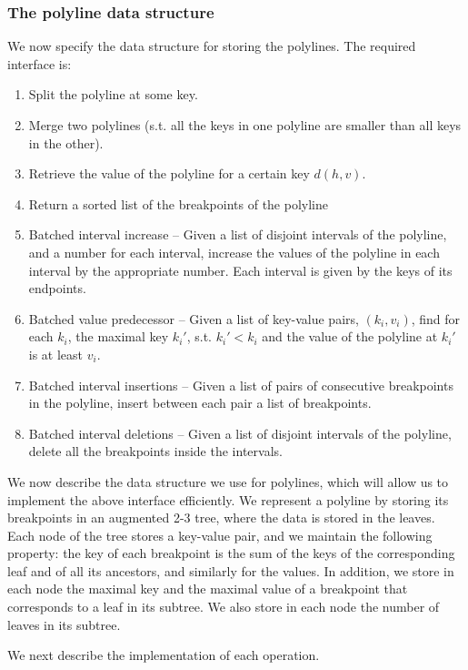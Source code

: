 \documentclass[a4paper,UKenglish]{lipics-v2016}
\theoremstyle{plain}
\begin{document}
\subsubsection{The polyline data structure} We now specify the data structure for storing the polylines. The required interface is:
\begin{enumerate}
\item \label{op1} Split the polyline at some key.
\item \label{op2} Merge two polylines (s.t. all the keys in one polyline are smaller than all keys in the other).
\item \label{op3} Retrieve the value of the polyline for a certain key $d(h,v)$.
\item \label{op4}Return a sorted list of the breakpoints of the polyline
\item \label{op5} Batched interval increase -- Given a list of disjoint intervals of the polyline, and a number for each interval, increase the values of the polyline in each interval by the appropriate number. Each interval is given by the keys of its endpoints.
\item \label{op6} Batched value predecessor -- Given a list of key-value pairs, $(k_i,v_i)$, find for each $k_i$, the maximal key $k_{i}'$, s.t. $k_{i}' < k_i$ and the value of the polyline at $k_{i}'$ is at least $v_i$.
\item \label{op7} Batched interval insertions -- Given a list of pairs of consecutive breakpoints in the polyline, insert between each pair a list of breakpoints.
\item \label{op8} Batched interval deletions -- Given a list of disjoint intervals of the polyline, delete all the breakpoints inside the intervals.
\end{enumerate}

We now describe the data structure we use for polylines, which will allow us to implement the above interface efficiently. We represent a polyline by storing its breakpoints in an augmented 2-3 tree, where the data is stored in the leaves. Each node of the tree stores a key-value pair, and we maintain the following property: the key of each breakpoint is the sum of the keys of the corresponding leaf and of all its ancestors, and similarly for the values. In addition, we store in each node the maximal key and the maximal value of a breakpoint that corresponds to a leaf in its subtree. We also store in each node the number of leaves in its subtree.

We next describe the implementation of each operation.
\end{document}
